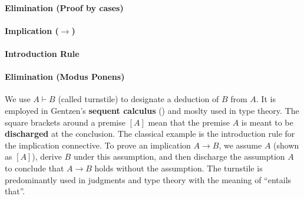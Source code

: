 \paragraph{ Elimination (Proof by cases)}
\begin{prooftree}
\end{prooftree}
\paragraph{Implication ($\to$)}
\paragraph{Introduction Rule}
\begin{prooftree}
\end{prooftree}
\paragraph{ Elimination (Modus Ponens)}
\begin{prooftree}
\end{prooftree}
\begin{notation}
  We use $A \vdash B$ (called turnstile) to designate a
  deduction of $B$ from $A$.
  It is employed in Gentzen’s \textbf{sequent calculus}
  (\cite{girard1989proofs})
  and moslty used in type theory.
  The square brackets around a premise $[A]$ mean that the premise $A$ is meant to
  be \textbf{discharged} at the conclusion. The classical example is the
  introduction rule for the implication connective.
  To prove an implication $A \to B$, we assume $A$
  (shown as $[A]$), derive $B$ under this assumption, and then discharge the
  assumption $A$ to conclude that $A \to B$ holds without the assumption.
  The turnstile is predominantly used in judgments and type theory with
  the meaning of ``entails that''.
\end{notation}
